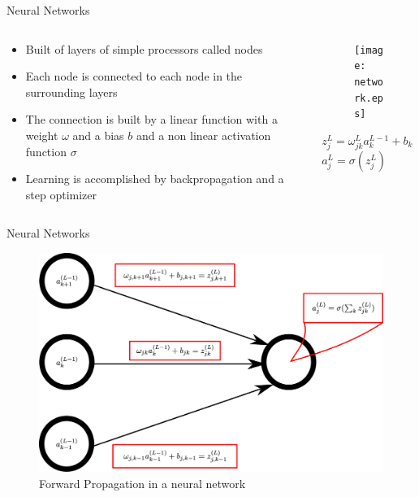 


\begin{frame}{Neural Networks}
\begin{columns}
    \begin{column}{0.5\textwidth}
    \begin{itemize}
        \item Built of layers of simple processors called nodes
        \item Each node is connected to each node in the surrounding layers
        \item The connection is built by a linear function with a weight $\omega$ and a bias $b$ 
        and a non linear activation function $\sigma$
        \item Learning is accomplished by backpropagation and a step optimizer
    \end{itemize}
    \end{column}
    \begin{column}{0.5\textwidth}
    \begin{figure}
        \centering
        \texttt{[image: network.eps]}
        \label{fig:my_label}
    \end{figure}
    \vspace{0.3cm}
    \begin{center}
     $z_j^L = \omega_{jk}^L a_k^{L-1} + b_k$\\
        $a_j^L = \sigma ( z_j^L )$
    \end{center}
    \end{column}
\end{columns}
\end{frame}

\begin{frame}{Neural Networks}
\begin{figure}
    \centering
    \includegraphics[scale=0.15]{nodes_nomenclature.eps}
    \caption{Forward Propagation in a neural network}
    \label{fig:my_label}
\end{figure}
\end{frame}

